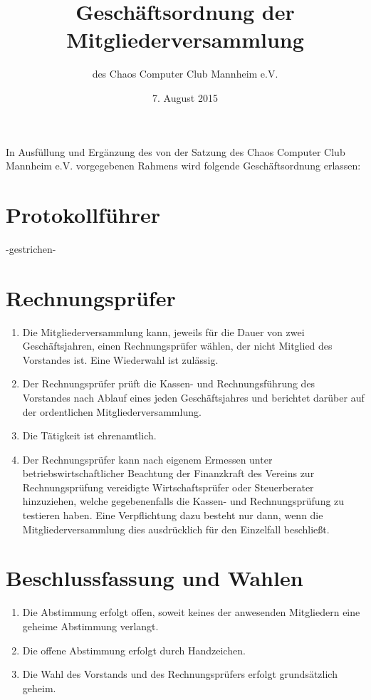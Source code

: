 \documentclass[a4paper, 12pt]{scrartcl}
\title{Geschäftsordnung der Mitgliederversammlung}
\subtitle{des Chaos Computer Club Mannheim e.V.}
\author{}
\date{7. August 2015}
\begin{document}
\maketitle

\noindent In Ausfüllung und Ergänzung des von der Satzung des Chaos Computer Club
Mannheim e.V. vorgegebenen Rahmens wird folgende Geschäftsordnung erlassen:

\section{Protokollführer}
-gestrichen-

\section{Rechnungsprüfer}
\begin{enumerate}
	\item Die Mitgliederversammlung kann, jeweils für die Dauer von zwei
Geschäftsjahren, einen Rechnungsprüfer wählen, der nicht Mitglied des
Vorstandes ist. Eine Wiederwahl ist zulässig.
	\item Der Rechnungsprüfer prüft die Kassen- und Rechnungsführung des
Vorstandes nach Ablauf eines jeden Geschäftsjahres und berichtet darüber
auf der ordentlichen Mitgliederversammlung.
	\item Die Tätigkeit ist ehrenamtlich.
	\item Der Rechnungsprüfer kann nach eigenem Ermessen unter
betriebswirtschaftlicher Beachtung der Finanzkraft des Vereins zur
Rechnungsprüfung vereidigte Wirtschaftsprüfer oder Steuerberater
hinzuziehen, welche gegebenenfalls die Kassen- und Rechnungsprüfung zu
testieren haben. Eine Verpflichtung dazu besteht nur dann, wenn die
Mitgliederversammlung dies ausdrücklich für den Einzelfall beschließt.
\end{enumerate}

\section{Beschlussfassung und Wahlen}
\begin{enumerate}
	\item Die Abstimmung erfolgt offen, soweit keines der anwesenden Mitgliedern eine geheime Abstimmung verlangt.
	\item Die offene Abstimmung erfolgt durch Handzeichen.
	\item Die Wahl des Vorstands und des Rechnungsprüfers erfolgt grundsätzlich geheim.
\end{enumerate}
\end{document}
